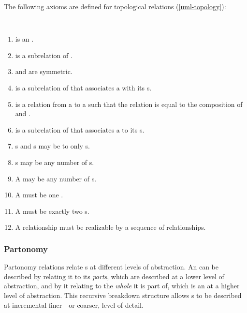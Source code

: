 The following axioms are defined for topological relations (\autoref{uml-topology}):
\begin{axioms}~
  \begin{enumerate}[resume=axioms,{label=(\arabic*)}]
  \item {} is an .
  \item {} is a subrelation of . 
  \item {} and  are symmetric.
  \item {} is a subrelation of
     that associates a  with its
    s.
  \item {} is a relation from a  to a
     such that the relation is equal to the composition
    of  and .
  \item {} is a subrelation of 
    that associates a  to its s.
  \item {}s and s may be  to only s.
  \item {}s may be  any number of s.
  \item A  may be  any number of s.
  \item A  must be   one .
  \item A  must be  exactly two s. 
  \item \label{ax:topology-realisable}A  relationship must be realizable by a sequence
      of  relationships.
  \end{enumerate}
\end{axioms}



\subsubsection{Partonomy}

Partonomy relations relate s at different levels of
abstraction.
%
An  can be described by relating it to its \emph{parts},
which are  described at a lower level of abstraction, and
by it relating to the \emph{whole} it is part of, which is an
 at a higher level of abstraction.
%
This recursive breakdown structure allows s to be
described at incremental finer---or coarser, level of detail.

